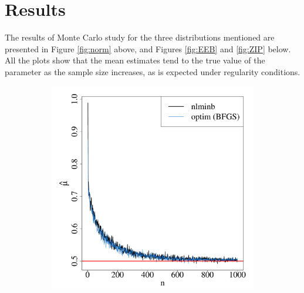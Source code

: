 \documentclass[nojss]{jss}
\begin{document}
\section{Results}\label{sec:results}

The results of Monte Carlo study for the three distributions mentioned are presented in Figure \ref{fig:norm} above, and Figures \ref{fig:EEB} and \ref{fig:ZIP} below. All the plots show that the mean estimates tend to the true value of the parameter as the sample size increases, as is expected under regularity conditions.




\begin{figure}[H]
  \centering
    \begin{subfigure}[h]{0.49\textwidth}
        \includegraphics[width=\textwidth]{article-EEBa}
        \caption{\label{fig:EEBa}}
    \end{subfigure}
    \begin{subfigure}[h]{0.49\textwidth}

\end{subfigure}
\end{figure}
\end{document}
